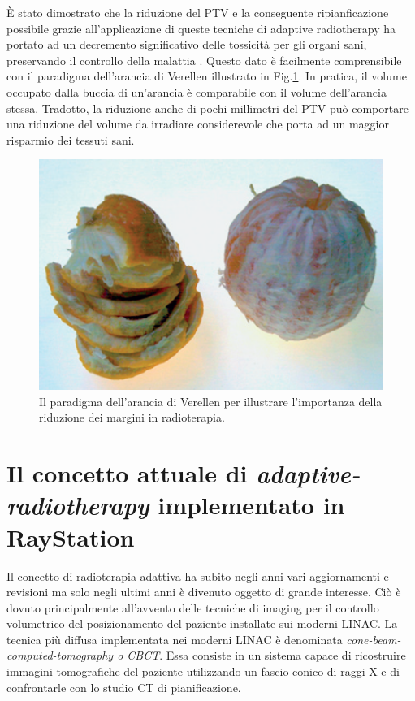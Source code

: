 \`E stato dimostrato che la riduzione del PTV e la conseguente ripianficazione possibile grazie all'applicazione di queste tecniche di adaptive radiotherapy ha portato ad un decremento significativo delle tossicità per gli organi sani, preservando il controllo della malattia \cite{Park2012}. Questo dato è facilmente comprensibile con il paradigma dell'arancia di Verellen \cite{Verellen2007} illustrato in Fig.\ref{fig:verellen}. In pratica, il volume occupato dalla buccia di un'arancia è comparabile con il volume dell'arancia stessa. Tradotto, la riduzione anche di pochi millimetri del PTV può comportare una riduzione del volume da irradiare considerevole che porta ad un maggior risparmio dei tessuti sani.
\begin{figure}[!t]
\centering
\includegraphics[width=.6\textwidth]{./cap3/Verellen.png}
\caption{Il paradigma dell'arancia di Verellen \cite{Verellen2007} per illustrare l'importanza della riduzione dei margini in radioterapia.}
\label{fig:verellen}
\end{figure}



\section{Il concetto attuale di \textit{adaptive-radiotherapy} implementato in RayStation}
Il concetto di radioterapia adattiva ha subito negli anni vari aggiornamenti e revisioni ma solo negli ultimi anni è divenuto oggetto di grande interesse. Ciò è dovuto principalmente all'avvento  delle tecniche di imaging per il controllo volumetrico del posizionamento del paziente installate sui moderni LINAC. La tecnica più diffusa implementata nei moderni LINAC è denominata \textit{cone-beam-computed-tomography o CBCT}. Essa consiste in un sistema capace di ricostruire immagini tomografiche del paziente utilizzando un fascio conico di raggi X e di confrontarle con lo studio CT di pianificazione.

